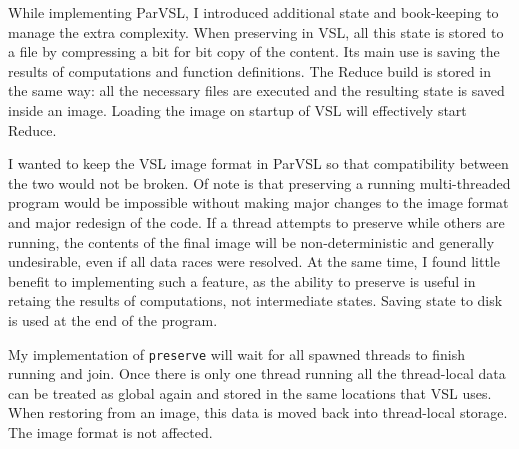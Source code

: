 While implementing ParVSL, I introduced additional state and book-keeping to manage the extra complexity.
When preserving in VSL, all this state is stored to a file by compressing a bit for bit copy of the
content. Its main use is saving the results of computations and function definitions.
The Reduce build is stored in the same way: all the necessary files are executed and the resulting
state is saved inside an image. Loading the image on startup of VSL will effectively start Reduce.

I wanted to keep the VSL image format in ParVSL so that compatibility between the two would not be broken.
Of note is that preserving a running multi-threaded program would be impossible without making major changes
to the image format and major redesign of the code. If a thread attempts to preserve while others
are running, the contents of the final image will be non-deterministic and generally undesirable,
even if all data races were resolved. At the same time, I found little benefit to implementing such
a feature, as the ability to preserve is useful in retaing the results of computations, not intermediate states.
Saving state to disk is used at the end of the program.

My implementation of \verb|preserve| will wait
for all spawned threads to finish running and join. Once there is only one thread running all the
thread-local data can be treated as global again and stored in the same locations that
VSL uses. When restoring from an image, this data is moved back into thread-local storage. The image
format is not affected.


